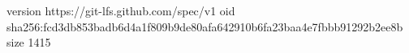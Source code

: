 version https://git-lfs.github.com/spec/v1
oid sha256:fcd3db853badb6d4a1f809b9de80afa642910b6fa23baa4e7fbbb91292b2ee8b
size 1415
